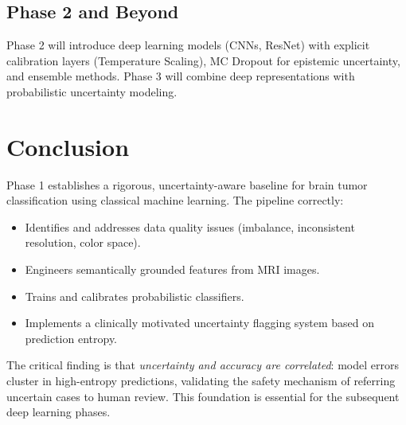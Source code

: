 \documentclass[12pt,a4paper]{article}
\begin{document}
\subsection{Phase 2 and Beyond}

Phase 2 will introduce deep learning models (CNNs, ResNet) with explicit calibration layers (Temperature Scaling), MC Dropout for epistemic uncertainty, and ensemble methods. Phase 3 will combine deep representations with probabilistic uncertainty modeling.

\section{Conclusion}

Phase 1 establishes a rigorous, uncertainty-aware baseline for brain tumor classification using classical machine learning. The pipeline correctly:
\begin{itemize}[noitemsep]
    \item Identifies and addresses data quality issues (imbalance, inconsistent resolution, color space).
    \item Engineers semantically grounded features from MRI images.
    \item Trains and calibrates probabilistic classifiers.
    \item Implements a clinically motivated uncertainty flagging system based on prediction entropy.
\end{itemize}

The critical finding is that \textit{uncertainty and accuracy are correlated}: model errors cluster in high-entropy predictions, validating the safety mechanism of referring uncertain cases to human review. This foundation is essential for the subsequent deep learning phases.
\end{document}
